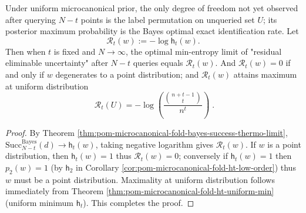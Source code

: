 \begin{theorem}\label{thm:pom-microcanonical-fold-residual-min-entropy}
Under uniform microcanonical prior, the only degree of freedom not yet observed after querying \(N-t\) points is the label permutation on unqueried set \(U\);
its posterior maximum probability is the Bayes optimal exact identification rate.
Let
\[
\mathcal{R}_t(w):=-\log \mathsf{h}_t(w).
\]
Then when \(t\) is fixed and \(N\to\infty\), the optimal min-entropy limit of "residual eliminable uncertainty" after \(N-t\) queries equals \(\mathcal{R}_t(w)\).
And \(\mathcal{R}_t(w)=0\) if and only if \(w\) degenerates to a point distribution;
and \(\mathcal{R}_t(w)\) attains maximum at uniform distribution
\[
\boxed{\;
\mathcal{R}_t(U)= -\log\!\left(\frac{\binom{n+t-1}{t}}{n^t}\right)\; } .
\]
\end{theorem}
\begin{proof}
By Theorem \ref{thm:pom-microcanonical-fold-bayes-success-thermo-limit},
\(
\mathrm{Succ}^{\mathrm{Bayes}}_{N-t}(d)\to \mathsf{h}_t(w)
\), taking negative logarithm gives \(\mathcal{R}_t(w)\).
If \(w\) is a point distribution, then \(\mathsf{h}_t(w)=1\) thus \(\mathcal{R}_t(w)=0\);
conversely if \(\mathsf{h}_t(w)=1\) then \(p_2(w)=1\) (by \(\mathsf{h}_2\) in Corollary \ref{cor:pom-microcanonical-fold-ht-low-order}) thus \(w\) must be a point distribution.
Maximality at uniform distribution follows immediately from Theorem \ref{thm:pom-microcanonical-fold-ht-uniform-min} (uniform minimum \(\mathsf{h}_t\)). This completes the proof.
\end{proof}

